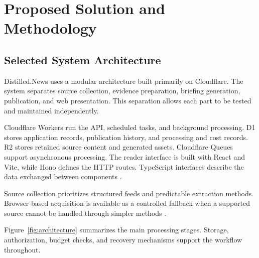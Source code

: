 \chapter{Proposed Solution and Methodology}
\label{chap:solution}

\section{Selected System Architecture}

Distilled.News uses a modular architecture built primarily on Cloudflare. The system separates source collection, evidence preparation, briefing generation, publication, and web presentation. This separation allows each part to be tested and maintained independently.

Cloudflare Workers run the API, scheduled tasks, and background processing. D1 stores application records, publication history, and processing and cost records. R2 stores retained source content and generated assets. Cloudflare Queues support asynchronous processing. The reader interface is built with React and Vite, while Hono defines the HTTP routes. TypeScript interfaces describe the data exchanged between components \cite{repo,stagingintegration}.

Source collection prioritizes structured feeds and predictable extraction methods. Browser-based acquisition is available as a controlled fallback when a supported source cannot be handled through simpler methods \cite{acquisition}.

Figure~\ref{fig:architecture} summarizes the main processing stages. Storage, authorization, budget checks, and recovery mechanisms support the workflow throughout.

